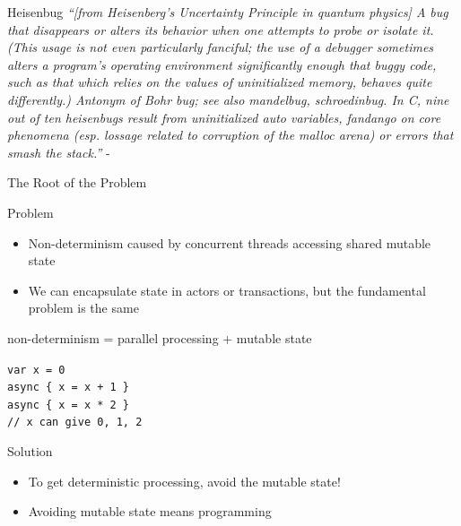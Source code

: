 \begin{frame}{Heisenbug}
\emph{``[from Heisenberg's Uncertainty Principle in quantum physics] A bug that
disappears or \alert{alters} its \alert{behavior when} one attempts to
\alert{probe} or isolate it. (This usage is not even particularly fanciful; the
use of a debugger sometimes alters a program's operating environment significantly enough that buggy code,
such as that which relies on the values of uninitialized memory, behaves quite
differently.) Antonym of Bohr bug; see also mandelbug, schroedinbug. In
\alert{C}, nine out of ten heisenbugs result from uninitialized auto variables,
fandango on core phenomena (esp. lossage related to corruption of the malloc
arena) or errors that smash the stack.''} -
\end{frame}


\begin{frame}[fragile]{The Root of the Problem}
\begin{alertblock}{Problem}
\begin{itemize}
  \item Non-determinism caused by concurrent threads accessing \alert{shared
  mutable state}
  \item We can encapsulate state in actors or transactions, but the fundamental
  problem is the same
\end{itemize}
\begin{center}
non-determinism = parallel processing + \alert{mutable state}
\end{center}
\end{alertblock}
\begin{center}
\lstinline!var x = 0!\\
\lstinline!async { x = x + 1 }!\\
\lstinline!async { x = x * 2 }!\\
\lstinline!// x can give 0, 1, 2!\\
\end{center}
\begin{exampleblock}{Solution}
\begin{itemize}
  \item To get deterministic processing, \alert{avoid} the mutable state!
  \item Avoiding mutable state means programming 
\end{itemize}
\end{exampleblock}
\end{frame}

